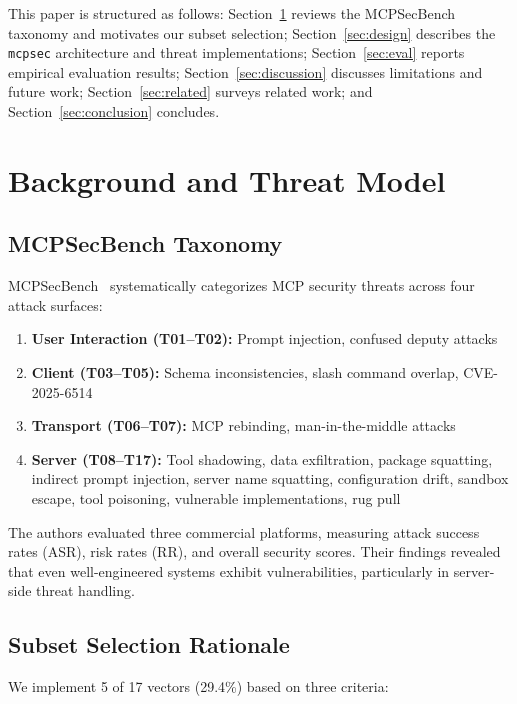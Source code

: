 \documentclass[11pt]{article}
\begin{document}
This paper is structured as follows: Section~\ref{sec:background} reviews the MCPSecBench taxonomy and motivates our subset selection; Section~\ref{sec:design} describes the \texttt{mcpsec} architecture and threat implementations; Section~\ref{sec:eval} reports empirical evaluation results; Section~\ref{sec:discussion} discusses limitations and future work; Section~\ref{sec:related} surveys related work; and Section~\ref{sec:conclusion} concludes.

\section{Background and Threat Model}
\label{sec:background}

\subsection{MCPSecBench Taxonomy}

MCPSecBench~\cite{yang2025mcpsecbench} systematically categorizes MCP security threats across four attack surfaces:

\begin{enumerate}
    \item \textbf{User Interaction (T01--T02):} Prompt injection, confused deputy attacks
    \item \textbf{Client (T03--T05):} Schema inconsistencies, slash command overlap, CVE-2025-6514
    \item \textbf{Transport (T06--T07):} MCP rebinding, man-in-the-middle attacks
    \item \textbf{Server (T08--T17):} Tool shadowing, data exfiltration, package squatting, indirect prompt injection, server name squatting, configuration drift, sandbox escape, tool poisoning, vulnerable implementations, rug pull
\end{enumerate}

The authors evaluated three commercial platforms, measuring attack success rates (ASR), risk rates (RR), and overall security scores. Their findings revealed that even well-engineered systems exhibit vulnerabilities, particularly in server-side threat handling.

\subsection{Subset Selection Rationale}

We implement 5 of 17 vectors (29.4\%) based on three criteria:
\end{document}

